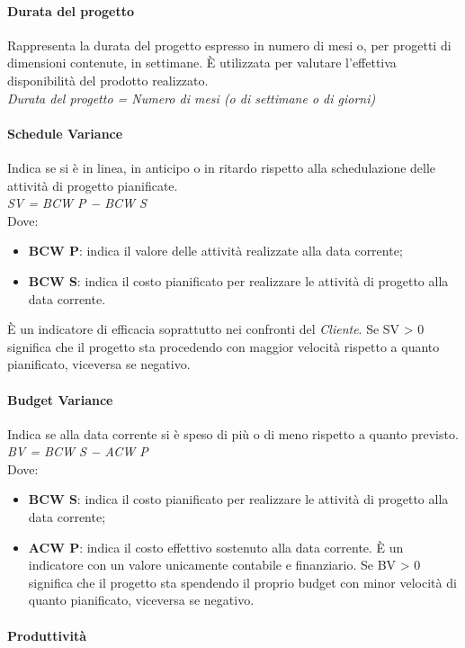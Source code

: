 \paragraph{Durata del progetto}
Rappresenta la durata del progetto espresso in numero di mesi o, per progetti di dimensioni contenute, in settimane. \`E utilizzata per valutare l'effettiva disponibilità del prodotto realizzato.\\
\textit{Durata del progetto = Numero di mesi (o di settimane o di giorni)}

\paragraph{Schedule Variance}
Indica se si \`e in linea, in anticipo o in ritardo rispetto alla schedulazione delle attività di progetto
pianificate. \\
\textit{SV = BCW P − BCW S} \\
Dove:
\begin{itemize}
	\item \textbf{BCW P}: indica il valore delle attivit\`a realizzate alla data corrente;
	\item \textbf{BCW S}: indica il costo pianificato per realizzare le attività di progetto alla data corrente.
\end{itemize}
\`E un indicatore di
efficacia soprattutto nei confronti del \textit{Cliente}. Se SV > 0 significa che il progetto sta procedendo
con maggior velocit\`a rispetto a quanto pianificato, viceversa se negativo.

\paragraph{Budget Variance}
Indica se alla data corrente si \`e speso di pi\`u o di meno rispetto a quanto previsto.\\
\textit{BV = BCW S − ACW P}\\
Dove:
\begin{itemize}
	\item \textbf{BCW S}: indica il costo pianificato per realizzare le attivit\`a di progetto alla data corrente;
	\item \textbf{ACW P}: indica il costo effettivo sostenuto alla data corrente. \`E un indicatore con
un valore unicamente contabile e finanziario. Se BV > 0 significa che il progetto sta spendendo
il proprio budget con minor velocit\`a di quanto pianificato, viceversa se negativo.
\end{itemize}

\paragraph{Produttivit\`a}
